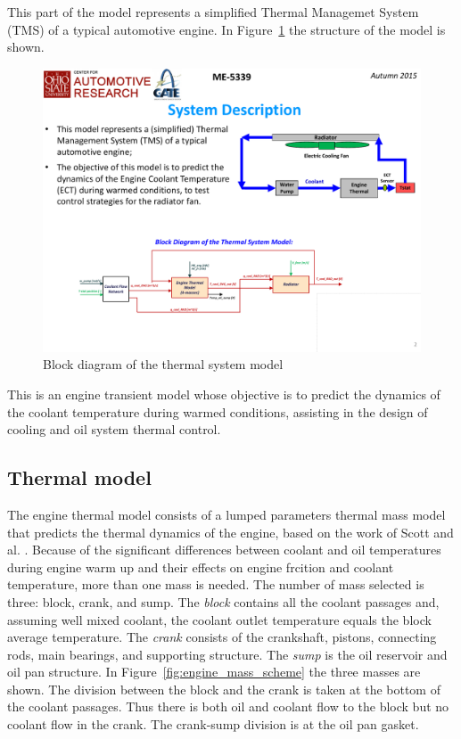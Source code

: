 This part of the model represents a simplified Thermal Managemet System (TMS) of a typical automotive engine. In Figure~\ref{fig:th_block_diagram} the structure of the model is shown. 

\begin{figure}[ht]
  \centering
  \includegraphics[width=\textwidth]{figures/model/th_block_diagram.pdf}
  \caption{Block diagram of the thermal system model\label{fig:th_block_diagram} }
\end{figure}

This is an engine transient model whose objective is to predict the dynamics of the coolant temperature during warmed conditions, assisting in the design of cooling and oil system thermal control. 

\subsection{Thermal model}

The engine thermal model consists of a lumped parameters thermal mass model that predicts the thermal dynamics of the engine, based on the work of Scott and al. \cite{Scott2012}. Because of the significant differences between coolant and oil temperatures during engine warm up and their effects on engine frcition and coolant temperature, more than one mass is needed. The number of mass selected is three: block, crank, and sump. The \emph{block} contains all the coolant passages and, assuming well mixed coolant, the coolant outlet temperature equals the block average temperature. The \emph{crank} consists of the crankshaft, pistons, connecting rods, main bearings, and supporting structure. The \emph{sump} is the oil reservoir and oil pan structure. In Figure~\ref{fig:engine_mass_scheme} the three masses are shown. The division between the block and the crank is taken at the bottom of the coolant passages. Thus there is both oil and coolant flow to the block but no coolant flow in the crank. The crank-sump division is at the oil pan gasket.

